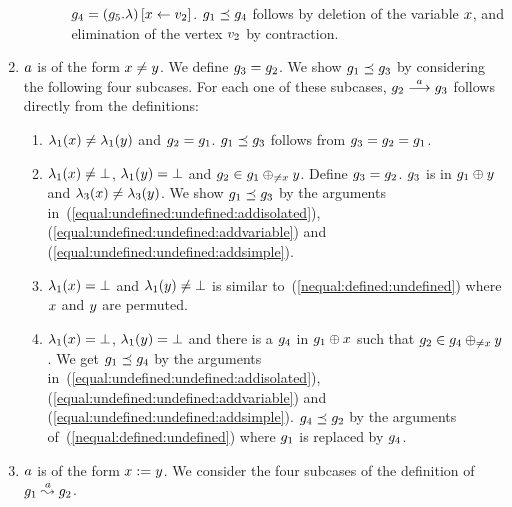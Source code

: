 \begin{enumerate}
\begin{enumerate}
\begin{enumerate}
$g_4=\left(g_5.\lambda\right)\left[x\leftarrow v_2\right]$.
%
$g_1\preceq g_4$ follows by deletion of the variable $x$, and elimination
of the vertex $v_2$ by contraction.
\end{enumerate}
%
\end{enumerate}
%
%
%
\item
$a$ is of the form $x\neq y$.
%
%
We define $g_3=g_2$.
%
We show $g_1\preceq g_3$ by considering 
the following four subcases.
%
For each one of these subcases, $g_2\stackrel{a}{\longrightarrow}g_3$ 
follows directly from the definitions:
\begin{enumerate}
\item
$\lambda_1(x)\neq\lambda_1(y)$ and 
$g_2=g_1$.
%
$g_1\preceq g_3$ follows from $g_3=g_2=g_1$.
\item
\label{nequal:defined:undefined}
$\lambda_1(x)\neq\bot$, $\lambda_1(y)=\bot$
and $g_2\in g_1\oplus_{\neq{\ensuremath{x}}}{y}$.
%
Define $g_3=g_2$. 
%
$g_3$ is in $g_1\oplus{\ensuremath{y}}$ 
and $\lambda_3(x)\neq\lambda_3(y)$.
%
%
We show $g_1\preceq g_3$
by the arguments in~(\ref{equal:undefined:undefined:addisolated}), 
(\ref{equal:undefined:undefined:addvariable}) and
(\ref{equal:undefined:undefined:addsimple}).
%
\item
$\lambda_1(x)=\bot$ and $\lambda_1(y)\neq\bot$
is similar to~(\ref{nequal:defined:undefined}) where $x$ and $y$
are permuted.
\item
$\lambda_1(x)=\bot$, $\lambda_1(y)=\bot$ and
there is a $g_4$ in $g_1\oplus{\ensuremath{x}}$
such that $g_2\in g_4\oplus_{\neq{\ensuremath{x}}}{y}$.
%
We get $g_1\preceq g_4$ by the arguments 
in~(\ref{equal:undefined:undefined:addisolated}), 
(\ref{equal:undefined:undefined:addvariable}) and
(\ref{equal:undefined:undefined:addsimple}).
%
$g_4\preceq g_2$ by the arguments of~(\ref{nequal:defined:undefined})
where $g_1$ is replaced by $g_4$.
\end{enumerate}
%
%
%
\item
$a$ is of the form $x:=y$.
%
We consider 
the four subcases of the definition of $g_1\stackrel{a}{\leadsto}g_2$.
% 
%
\begin{enumerate}

\end{enumerate}
\end{enumerate}
